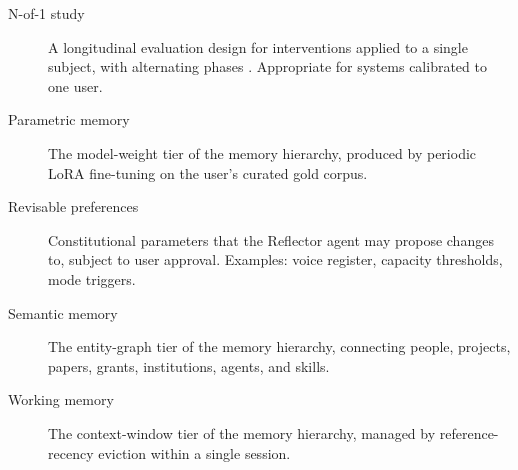 \documentclass[11pt,a4paper]{article}
\begin{document}
\begin{description}
  \item[N-of-1 study] A longitudinal evaluation design for interventions applied to a single subject, with alternating phases \citep{lillie2011nof1}. Appropriate for systems calibrated to one user.

  \item[Parametric memory] The model-weight tier of the memory hierarchy, produced by periodic LoRA fine-tuning on the user's curated gold corpus.

  \item[Revisable preferences] Constitutional parameters that the Reflector agent may propose changes to, subject to user approval. Examples: voice register, capacity thresholds, mode triggers.

  \item[Semantic memory] The entity-graph tier of the memory hierarchy, connecting people, projects, papers, grants, institutions, agents, and skills.

  \item[Working memory] The context-window tier of the memory hierarchy, managed by reference-recency eviction within a single session.
\end{description}



\end{document}
